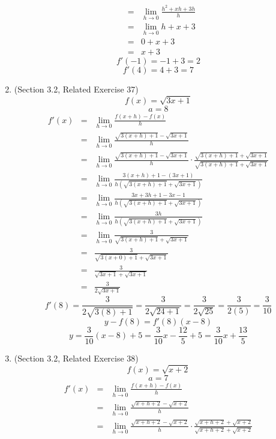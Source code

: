 \documentclass{article}
\begin{document}
\begin{enumerate}
\begin{eqnarray}
        &=& \lim_{h \to 0}{\frac{h^2 + xh + 3h}{h}} \\
        &=& \lim_{h \to 0}{h + x + 3} \\
        &=& 0 + x + 3 \\
        &=& x + 3
    \end{eqnarray}
    $$f'(-1) = -1 + 3 = 2$$
    $$f'(4) = 4 + 3 = 7$$
    \item (Section 3.2, Related Exercise 37)
    $$f(x) = \sqrt{3x + 1}$$
    $$a = 8$$
    \begin{eqnarray}
        f'(x) &=& \lim_{h \to 0}{\frac{f(x + h) - f(x)}{h}} \\
              &=& \lim_{h \to 0}{\frac{\sqrt{3(x + h) + 1} - \sqrt{3x + 1}}{h}} \\
              &=& \lim_{h \to 0}{\frac{\sqrt{3(x + h) + 1} - \sqrt{3x + 1}}{h} \cdot \frac{\sqrt{3(x + h) + 1} + \sqrt{3x + 1}}{\sqrt{3(x + h) + 1} + \sqrt{3x + 1}}} \\
              &=& \lim_{h \to 0}{\frac{3(x + h) + 1 - (3x + 1)}{h(\sqrt{3(x + h) + 1} + \sqrt{3x + 1})}} \\
              &=& \lim_{h \to 0}{\frac{3x + 3h + 1 - 3x - 1}{h(\sqrt{3(x + h) + 1} + \sqrt{3x + 1})}} \\
              &=& \lim_{h \to 0}{\frac{3h}{h(\sqrt{3(x + h) + 1} + \sqrt{3x + 1})}} \\
              &=& \lim_{h \to 0}{\frac{3}{\sqrt{3(x + h) + 1} + \sqrt{3x + 1}}} \\
              &=& \frac{3}{\sqrt{3(x + 0) + 1} + \sqrt{3x + 1}} \\
              &=& \frac{3}{\sqrt{3x + 1} + \sqrt{3x + 1}} \\
              &=& \frac{3}{2 \sqrt{3x + 1}}
    \end{eqnarray}
    $$f'(8) = \frac{3}{2\sqrt{3(8) + 1}} = \frac{3}{2\sqrt{24 + 1}} = \frac{3}{2\sqrt{25}} = \frac{3}{2(5)} = \frac{3}{10}$$
    $$y - f(8) = f'(8)(x - 8)$$
    $$y = \frac{3}{10}(x - 8) + 5 = \frac{3}{10}x - \frac{12}{5} + 5 = \frac{3}{10}x + \frac{13}{5}$$
    \item (Section 3.2, Related Exercise 38)
    $$f(x) = \sqrt{x + 2}$$
    $$a = 7$$
    \begin{eqnarray}
        f'(x) &=& \lim_{h \to 0}{\frac{f(x + h) - f(x)}{h}} \\
              &=& \lim_{h \to 0}{\frac{\sqrt{x + h + 2} - \sqrt{x + 2}}{h}} \\
              &=& \lim_{h \to 0}{\frac{\sqrt{x + h + 2} - \sqrt{x + 2}}{h} \cdot \frac{\sqrt{x + h + 2} + \sqrt{x + 2}}{\sqrt{x + h + 2} + \sqrt{x + 2}}} \\

\end{eqnarray}
\end{enumerate}
\end{document}
